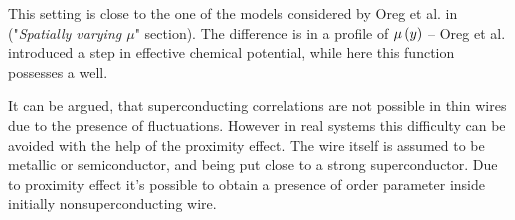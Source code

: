   This setting is close to the one of the models  considered by Oreg et al. in \cite{Oreg_2010} ("\textit{Spatially varying $ \mu $}" section). The difference is in a profile of $ \mu\left(y\right) $ -- Oreg et al.  introduced a step in effective chemical potential, while here this function possesses a well.  
  
It can be argued, that superconducting correlations are not possible in thin wires due to the presence of fluctuations. However in real systems this difficulty can be avoided with the help of the proximity effect. The wire itself is assumed to be metallic or semiconductor, and being put close to a strong superconductor. Due to proximity effect it's possible to obtain a presence of order parameter inside initially nonsuperconducting wire.